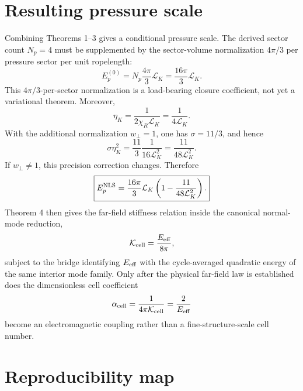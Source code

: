 \documentclass[11pt]{article}
\newcommand{\LK}{\mathcal L_K}
\newcommand{\Kcell}{\mathcal K_{\rm cell}}
\newcommand{\Eeff}{E_{\rm eff}}
\newcommand{\EpNLS}{E_p^{\rm NLS}}
\newcommand{\alphacell}{\alpha_{\rm cell}}
\begin{document}
\section{Resulting pressure scale}

Combining Theorems 1--3 gives a conditional pressure scale.  The derived
sector count \(N_p=4\) must be supplemented by the sector-volume normalization
\(4\pi/3\) per pressure sector per unit ropelength:
\[
  E_p^{(0)}
  =
  N_p\frac{4\pi}{3}\LK
  =
  \frac{16\pi}{3}\LK.
\]
This \(4\pi/3\)-per-sector normalization is a load-bearing closure coefficient,
not yet a variational theorem.
Moreover,
\[
  \eta_K
  =
  \frac{1}{2\chi_R\LK}
  =
  \frac{1}{4\LK}.
\]
With the additional normalization \(w_\perp=1\), one has
\(\sigma=11/3\), and hence
\[
  \sigma\eta_K^2
  =
  \frac{11}{3}\frac{1}{16\LK^2}
  =
  \frac{11}{48\LK^2}.
\]
If \(w_\perp\neq1\), this precision correction changes.
Therefore
\[
  \boxed{
  \EpNLS
  =
  \frac{16\pi}{3}\LK
  \left(
  1-\frac{11}{48\LK^2}
  \right).
  }
\]
Theorem 4 then gives the far-field stiffness relation inside the canonical
normal-mode reduction,
\[
  \Kcell=\frac{\Eeff}{8\pi},
\]
subject to the bridge identifying \(\Eeff\) with the cycle-averaged quadratic
energy of the same interior mode family.  Only after the physical far-field law
is established does the dimensionless cell coefficient
\[
  \alphacell
  =
  \frac{1}{4\pi\Kcell}
  =
  \frac{2}{\Eeff}
\]
become an electromagnetic coupling rather than a fine-structure-scale cell
number.


\section{Reproducibility map}
\end{document}
